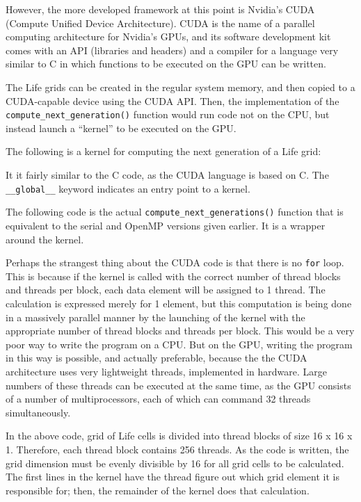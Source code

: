 \documentclass[letterpaper,12pt]{article}
\begin{document}
However, the more developed framework at this point is Nvidia's CUDA (Compute
Unified Device Architecture).  CUDA is the name of a parallel computing
architecture for Nvidia's GPUs, and its software development kit comes with an
API (libraries and headers) and a compiler for a language very similar to C in
which functions to be executed on the GPU can be written.

The Life grids can be created in the regular system memory, and then copied to
a CUDA-capable device using the CUDA API.  Then, the implementation of the {\tt
compute\_next\_generation()} function would run code not on the CPU, but instead
launch a ``kernel'' to be executed on the GPU.  

The following is a kernel for computing the next generation of a Life grid:



It it fairly similar to the C code, as the CUDA language is based on C.  The
{\tt \_\_global\_\_} keyword indicates an entry point to a kernel. 

The following code is the actual {\tt compute\_next\_generations()} function
that is equivalent to the serial and OpenMP versions given earlier.  It is a
wrapper around the kernel.



Perhaps the strangest thing about the CUDA code is that there is no {\tt for}
loop.  This is because if the kernel is called with the correct number of thread
blocks and threads per block, each data element will be assigned to 1 thread.
The calculation is expressed merely for 1 element, but this computation is being
done in a massively parallel manner by the launching of the kernel with the
appropriate number of thread blocks and threads per block.  This would be a very
poor way to write the program on a CPU.  But on the GPU, writing the program in
this way is possible, and actually preferable, because the the CUDA architecture
uses very lightweight threads, implemented in hardware.  Large numbers of these
threads can be executed at the same time, as the GPU consists of a number of
multiprocessors, each of which can command 32 threads
simultaneously.\cite{cuda_prog_guide}  

In the above code, grid of Life cells is divided into thread blocks of size 16 x
16 x 1.  Therefore, each thread block contains 256 threads.  As the code is
written, the grid dimension must be evenly divisible by 16 for all grid cells to
be calculated.  The first lines in the kernel have the thread figure out which
grid element it is responsible for; then, the remainder of the kernel does that
calculation.
\end{document}
